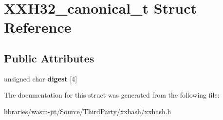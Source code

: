 \hypertarget{struct_x_x_h32__canonical__t}{}\section{X\+X\+H32\+\_\+canonical\+\_\+t Struct Reference}
\label{struct_x_x_h32__canonical__t}
\subsection*{Public Attributes}
\begin{DoxyCompactItemize}
\item 
\mbox{\label{struct_x_x_h32__canonical__t_a85a83578344a5dd1c7a6cc0472230f30}} 
unsigned char {\bfseries digest} \mbox{[}4\mbox{]}
\end{DoxyCompactItemize}


The documentation for this struct was generated from the following file\+:\begin{DoxyCompactItemize}
\item 
libraries/wasm-\/jit/\+Source/\+Third\+Party/xxhash/xxhash.\+h\end{DoxyCompactItemize}

